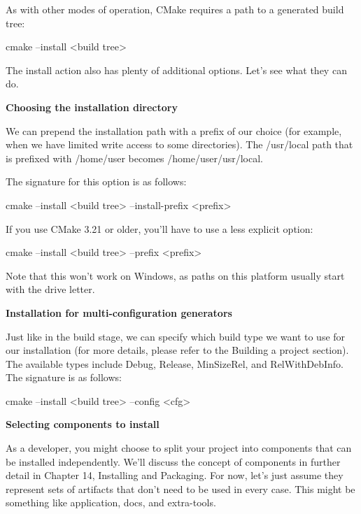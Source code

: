 As with other modes of operation, CMake requires a path to a generated build tree:

\begin{shell}
cmake --install <build tree>
\end{shell}

The install action also has plenty of additional options. Let’s see what they can do.

\noindent
\textbf{Choosing the installation directory}

We can prepend the installation path with a prefix of our choice (for example, when we have limited write access to some directories). The /usr/local path that is prefixed with /home/user becomes /home/user/usr/local.

The signature for this option is as follows:

\begin{shell}
cmake --install <build tree> --install-prefix <prefix>
\end{shell}

If you use CMake 3.21 or older, you’ll have to use a less explicit option:

\begin{shell}
cmake --install <build tree> --prefix <prefix>
\end{shell}

Note that this won’t work on Windows, as paths on this platform usually start with the drive letter.

\noindent
\textbf{Installation for multi-configuration generators}

Just like in the build stage, we can specify which build type we want to use for our installation (for more details, please refer to the Building a project section). The available types include Debug, Release, MinSizeRel, and RelWithDebInfo. The signature is as follows:

\begin{shell}
cmake --install <build tree> --config <cfg>
\end{shell}

\noindent
\textbf{Selecting components to install}

As a developer, you might choose to split your project into components that can be installed independently. We’ll discuss the concept of components in further detail in Chapter 14, Installing and Packaging. For now, let’s just assume they represent sets of artifacts that don’t need to be used in every case. This might be something like application, docs, and extra-tools.

